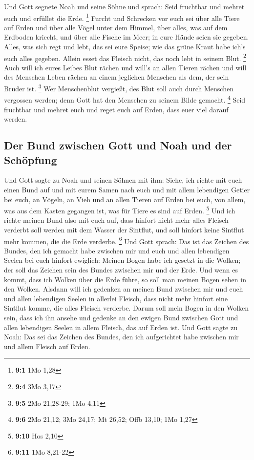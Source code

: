  Und Gott segnete Noah und seine Söhne und sprach: Seid
fruchtbar und mehret euch und erfüllet die Erde. \footnote{\textbf{9:1}
  1Mo 1,28}  Furcht und Schrecken vor euch sei über alle
Tiere auf Erden und über alle Vögel unter dem Himmel, über alles, was
auf dem Erdboden kriecht, und über alle Fische im Meer; in eure Hände
seien sie gegeben.  Alles, was sich regt und lebt, das sei
eure Speise; wie das grüne Kraut habe ich's euch alles gegeben.
 Allein esset das Fleisch nicht, das noch lebt in seinem
Blut. \footnote{\textbf{9:4} 3Mo 3,17}  Auch will ich
eures Leibes Blut rächen und will's an allen Tieren rächen und will des
Menschen Leben rächen an einem jeglichen Menschen als dem, der sein
Bruder ist. \footnote{\textbf{9:5} 2Mo 21,28-29; 1Mo 4,11}
 Wer Menschenblut vergießt, des Blut soll auch durch
Menschen vergossen werden; denn Gott hat den Menschen zu seinem Bilde
gemacht. \footnote{\textbf{9:6} 2Mo 21,12; 3Mo 24,17; Mt 26,52; Offb
  13,10; 1Mo 1,27}  Seid fruchtbar und mehret euch und
reget euch auf Erden, dass euer viel darauf werden.

\hypertarget{der-bund-zwischen-gott-und-noah-und-der-schuxf6pfung}{%
\subsection{Der Bund zwischen Gott und Noah und der
Schöpfung}\label{der-bund-zwischen-gott-und-noah-und-der-schuxf6pfung}}

 Und Gott sagte zu Noah und seinen Söhnen mit ihm:
 Siehe, ich richte mit euch einen Bund auf und mit eurem
Samen nach euch  und mit allem lebendigen Getier bei
euch, an Vögeln, an Vieh und an allen Tieren auf Erden bei euch, von
allem, was aus dem Kasten gegangen ist, was für Tiere es sind auf Erden.
\footnote{\textbf{9:10} Hos 2,10}  Und ich richte meinen
Bund also mit euch auf, dass hinfort nicht mehr alles Fleisch verderbt
soll werden mit dem Wasser der Sintflut, und soll hinfort keine Sintflut
mehr kommen, die die Erde verderbe. \footnote{\textbf{9:11} 1Mo 8,21-22}
 Und Gott sprach: Das ist das Zeichen des Bundes, den ich
gemacht habe zwischen mir und euch und allen lebendigen Seelen bei euch
hinfort ewiglich:  Meinen Bogen habe ich gesetzt in die
Wolken; der soll das Zeichen sein des Bundes zwischen mir und der Erde.
 Und wenn es kommt, dass ich Wolken über die Erde führe,
so soll man meinen Bogen sehen in den Wolken.  Alsdann
will ich gedenken an meinen Bund zwischen mir und euch und allen
lebendigen Seelen in allerlei Fleisch, dass nicht mehr hinfort eine
Sintflut komme, die alles Fleisch verderbe.  Darum soll
mein Bogen in den Wolken sein, dass ich ihn ansehe und gedenke an den
ewigen Bund zwischen Gott und allen lebendigen Seelen in allem Fleisch,
das auf Erden ist.  Und Gott sagte zu Noah: Das sei das
Zeichen des Bundes, den ich aufgerichtet habe zwischen mir und allem
Fleisch auf Erden.

